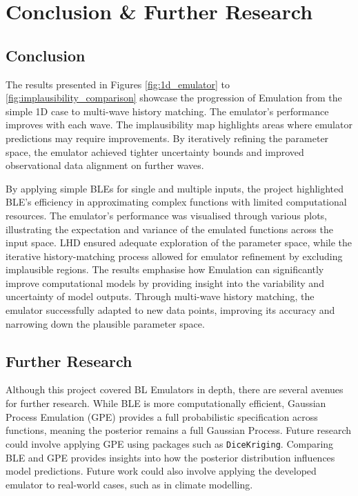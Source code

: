 \documentclass[12pt]{report} %
\begin{document}
\chapter{Conclusion \& Further Research}

\section{Conclusion}
The results presented in Figures \ref{fig:1d_emulator} to \ref{fig:implausibility_comparison} showcase the progression of Emulation from the simple 1D case to multi-wave history matching. The emulator's performance improves with each wave. The implausibility map highlights areas where emulator predictions may require improvements. By iteratively refining the parameter space, the emulator achieved tighter uncertainty bounds and improved observational data alignment on further waves.

By applying simple BLEs for single and multiple inputs, the project highlighted BLE's efficiency in approximating complex functions with limited computational resources. The emulator's performance was visualised through various plots, illustrating the expectation and variance of the emulated functions across the input space. LHD ensured adequate exploration of the parameter space, while the iterative history-matching process allowed for emulator refinement by excluding implausible regions. The results emphasise how Emulation can significantly improve computational models by providing insight into the variability and uncertainty of model outputs. Through multi-wave history matching, the emulator successfully adapted to new data points, improving its accuracy and narrowing down the plausible parameter space.

\section{Further Research}
Although this project covered BL Emulators in depth, there are several avenues for further research. While BLE is more computationally efficient, Gaussian Process Emulation (GPE) provides a full probabilistic specification across functions, meaning the posterior remains a full Gaussian Process. \cite{vernon2024} Future research could involve applying GPE using packages such as \texttt{DiceKriging}. Comparing BLE and GPE provides insights into how the posterior distribution influences model predictions. 
 Future work could also involve applying the developed emulator to real-world cases, such as in climate modelling.

\makeatletter
\renewcommand\@biblabel[1]{#1.} %
\makeatother


\end{document}
